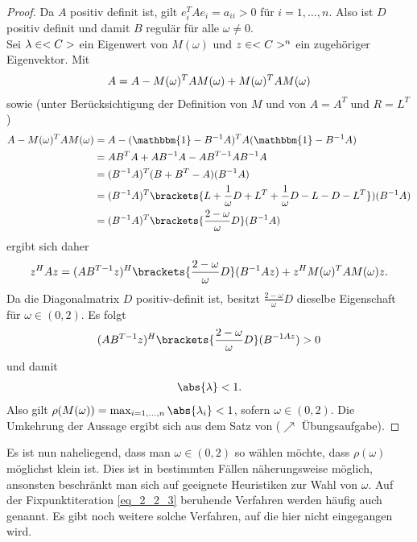 \begin{proof}
	Da $A$ positiv definit ist, gilt $e_i^TA e_i = a_{ii} > 0$ für $i = 1, \dots, n$. Also ist $D$ positiv definit und damit $B$ regulär für alle $\omega \neq 0$.\\
	Sei $\lambda \in <C>$ ein Eigenwert von $M(\omega)$ und $z \in <C>^n$ ein zugehöriger Eigenvektor. Mit
	\begin{align}
		A = A - M(\omega)^T AM(\omega) + M(\omega)^T AM(\omega) \notag
	\end{align}
	sowie (unter Berücksichtigung der Definition von $M$ und von $A = A^T$ und $R = L^T$)
	\begin{align}
	A - M(\omega)^T AM(\omega) 
	&= A - (\mathbbm{1} - B^{-1}A)^T A(\mathbbm{1}-B^{-1}A)\notag\\
	&= AB^T A + AB^{-1}A - AB^{T-1}AB^{-1}A\notag\\
	&= (B^{-1}A)^T (B + B^T - A)(B^{-1}A)\notag\\
	&= (B^{-1}A)^T \brackets{L + \frac{1}{\omega}D + L^T + \frac{1}{\omega}D - L - D - L^T})(B^{-1}A)\notag\\
	&= (B^{-1}A)^T\brackets{\frac{2 -\omega}{\omega}D}(B^{-1}A)\notag
	\end{align}
	ergibt sich daher
	\begin{align}
		z^H Az = (AB^{T-1}z)^H\brackets{\frac{2 -\omega}{\omega}D}(B^{-1}Az) + z^H M(\omega)^T AM(\omega)z.\notag
	\end{align}
	Da die Diagonalmatrix $D$ positiv-definit ist, besitzt $\frac{2-\omega}{\omega}D$ dieselbe Eigenschaft für $\omega \in (0,2)$. Es folgt
	\begin{align}
		(AB^{T-1}z)^H \brackets{\frac{2 -\omega}{\omega}D} (B^{-1 Az}) > 0 \notag
	\end{align}
	und damit
	\begin{align}
		\abs{\lambda} < 1.
	\end{align}
	Also gilt $\rho(M(\omega)) = \max_{i = 1,\dots,n}\abs{\lambda_i} < 1$, sofern $\omega \in (0,2)$. Die Umkehrung der Aussage ergibt sich aus dem Satz von  ($\nearrow$ Übungsaufgabe). %
\end{proof}

Es ist nun naheliegend, dass man $\omega \in(0,2)$ so wählen möchte, dass $\rho(\omega)$ möglichst klein ist. Dies ist in bestimmten Fällen näherungsweise möglich, ansonsten beschränkt man sich auf geeignete Heuristiken zur Wahl von $\omega$. Auf der Fixpunktiteration \cref{eq_2_2_3} beruhende Verfahren werden häufig auch  genannt. Es gibt noch weitere solche Verfahren, auf die hier nicht eingegangen wird.